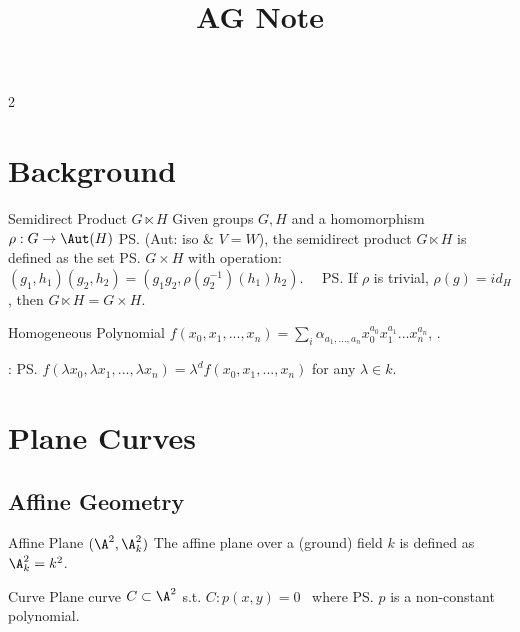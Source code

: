 \documentclass{note}
\title{AG Note}
\author{}
\begin{document}
\maketitle

\begin{multicols}{2}

    \section{Background}

    \begin{MyTh}{Semidirect Product $G \ltimes H$}
        Given groups $G,H$ and a homomorphism $\rho: G\to \Aut(H)$ \ps{\tiny (Aut: iso \& $V=W$)}, the semidirect product $G \ltimes H$ is defined as the set \ps{$G\times H$} with operation: {\tiny $(g_1,h_1)(g_2,h_2) = (g_1g_2, \rho(g_2^{-1})(h_1)h_2)$}. \qquad \quad \ \ \ps{\tiny If $\rho$ is trivial, $\rho(g)=id_H$, then $G \ltimes H = G \times H$.}
    \end{MyTh}

    \begin{MyTh}{Homogeneous Polynomial}
        \tiny $f(x_0,x_1,...,x_n)=\sum_i \alpha_{a_1,...,a_n} x_0^{a_0}x_1^{a_1}...x_n^{a_n}$, .
        
        \vspace{-2pt}
        \quad {}: \ps{$f(\lambda x_0, \lambda x_1,...,\lambda x_n) = \lambda^d f(x_0,x_1,...,x_n)$} for any $\lambda \in k$.
    \end{MyTh}


    
    \section{Plane Curves}

    \subsection{Affine Geometry}

    \begin{MyTh}{Affine Plane $(\A^2,\A_k^2)$}
        The affine plane over a (ground) field $k$ is defined as $\A_k^2 = k^2$.
    \end{MyTh}

    \begin{MyTh}{Curve}
        Plane curve $C\subset \A^2$ s.t. $C: p(x,y)=0$ \ where \ps{$p$} is a non-constant polynomial.
    \end{MyTh}


\end{multicols}
\end{document}
